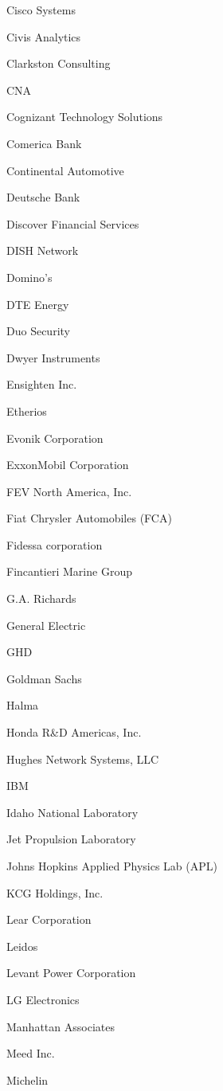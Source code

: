 \documentclass[twoside]{article}
\begin{document}
\begin{center}
\begin{multicols}{5}
\begin{FlushLeft}
\begin{compactitem}
\item Cisco Systems
\item Civis Analytics
\item Clarkston Consulting
\item CNA
\item Cognizant Technology Solutions
\item Comerica Bank
\item Continental Automotive
\item Deutsche Bank
\item Discover Financial Services
\item DISH Network
\item Domino's
\item DTE Energy
\item Duo Security
\item Dwyer Instruments
\item Ensighten Inc.
\item Etherios
\item Evonik Corporation
\item ExxonMobil Corporation
\item FEV North America, Inc.
\item Fiat Chrysler Automobiles (FCA)
\item Fidessa corporation
\item Fincantieri Marine Group
\item G.A. Richards
\item General Electric
\item GHD
\item Goldman Sachs
\item Halma
\item Honda R\&D Americas, Inc.
\item Hughes Network Systems, LLC
\item IBM
\item Idaho National Laboratory
\item Jet Propulsion Laboratory
\item Johns Hopkins Applied Physics Lab (APL)
\item KCG Holdings, Inc.
\item Lear Corporation
\item Leidos
\item Levant Power Corporation
\item LG Electronics
\item Manhattan Associates
\item Meed Inc.
\item Michelin

\end{compactitem}
\end{FlushLeft}
\end{multicols}
\end{center}
\end{document}
